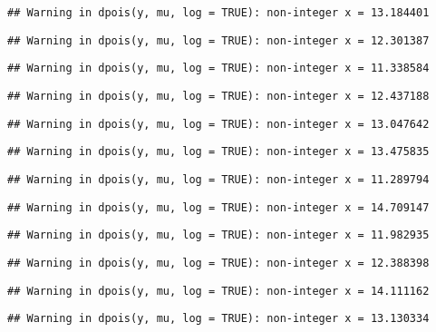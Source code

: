 \documentclass[
]{article}
\begin{document}
\begin{verbatim}
## Warning in dpois(y, mu, log = TRUE): non-integer x = 13.184401
\end{verbatim}

\begin{verbatim}
## Warning in dpois(y, mu, log = TRUE): non-integer x = 12.301387
\end{verbatim}

\begin{verbatim}
## Warning in dpois(y, mu, log = TRUE): non-integer x = 11.338584
\end{verbatim}

\begin{verbatim}
## Warning in dpois(y, mu, log = TRUE): non-integer x = 12.437188
\end{verbatim}

\begin{verbatim}
## Warning in dpois(y, mu, log = TRUE): non-integer x = 13.047642
\end{verbatim}

\begin{verbatim}
## Warning in dpois(y, mu, log = TRUE): non-integer x = 13.475835
\end{verbatim}

\begin{verbatim}
## Warning in dpois(y, mu, log = TRUE): non-integer x = 11.289794
\end{verbatim}

\begin{verbatim}
## Warning in dpois(y, mu, log = TRUE): non-integer x = 14.709147
\end{verbatim}

\begin{verbatim}
## Warning in dpois(y, mu, log = TRUE): non-integer x = 11.982935
\end{verbatim}

\begin{verbatim}
## Warning in dpois(y, mu, log = TRUE): non-integer x = 12.388398
\end{verbatim}

\begin{verbatim}
## Warning in dpois(y, mu, log = TRUE): non-integer x = 14.111162
\end{verbatim}

\begin{verbatim}
## Warning in dpois(y, mu, log = TRUE): non-integer x = 13.130334
\end{verbatim}
\end{document}
